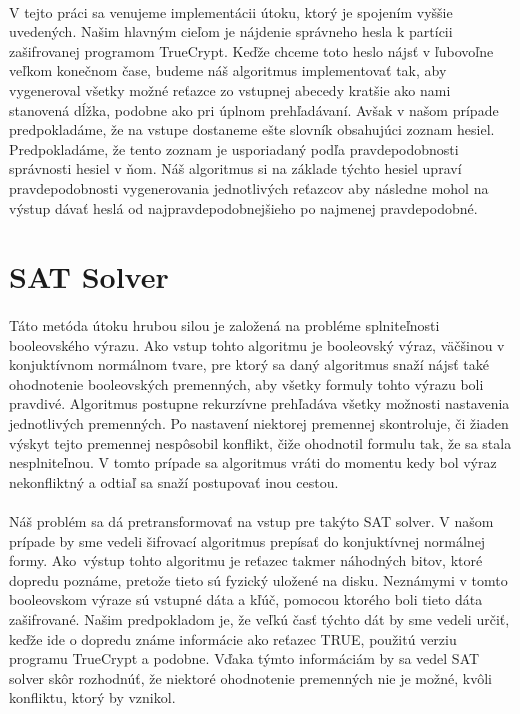 \paragraph{}
V tejto práci sa venujeme implementácii útoku, ktorý je spojením vyššie uvedených. Našim hlavným cieľom je nájdenie správneho hesla k partícii zašifrovanej programom TrueCrypt. Keďže chceme toto heslo nájsť v ľubovoľne veľkom konečnom čase, budeme náš algoritmus implementovať tak, aby vygeneroval všetky možné reťazce zo vstupnej abecedy kratšie ako nami stanovená dĺžka, podobne ako pri úplnom prehľadávaní. Avšak v našom prípade predpokladáme, že na vstupe dostaneme ešte slovník obsahujúci zoznam hesiel. Predpokladáme, že tento zoznam je usporiadaný podľa pravdepodobnosti správnosti hesiel v ňom. Náš algoritmus si na základe týchto hesiel upraví pravdepodobnosti vygenerovania jednotlivých reťazcov aby následne mohol na výstup dávať heslá od najpravdepodobnejšieho po najmenej pravdepodobné. 

\section{SAT Solver}
\paragraph{}
Táto metóda útoku hrubou silou je založená na probléme splniteľnosti booleovského výrazu. Ako vstup tohto algoritmu je booleovský výraz, väčšinou v konjuktívnom normálnom tvare, pre ktorý sa daný algoritmus snaží nájsť také ohodnotenie booleovských premenných, aby všetky formuly tohto výrazu boli pravdivé. Algoritmus postupne rekurzívne prehľadáva všetky možnosti nastavenia jednotlivých premenných. Po nastavení niektorej premennej skontroluje, či žiaden výskyt tejto premennej nespôsobil konflikt, čiže ohodnotil formulu tak, že sa stala nesplniteľnou. V tomto prípade sa algoritmus vráti do momentu kedy bol výraz nekonfliktný a odtiaľ sa snaží postupovať inou cestou.

\paragraph{}
Náš problém sa dá pretransformovať na vstup pre takýto SAT solver. V našom prípade by sme vedeli šifrovací algoritmus prepísať do konjuktívnej normálnej formy. Ako~výstup tohto algoritmu je reťazec takmer náhodných bitov, ktoré dopredu poznáme, pretože tieto sú fyzický uložené na disku. Neznámymi v tomto booleovskom výraze sú vstupné dáta a kľúč, pomocou ktorého boli tieto dáta zašifrované. Našim predpokladom je, že veľkú časť týchto dát by sme vedeli určiť, keďže ide o dopredu známe informácie ako reťazec TRUE, použitú verziu programu TrueCrypt a podobne. Vďaka týmto informáciám by sa vedel SAT solver skôr rozhodnúť, že niektoré ohodnotenie premenných nie je možné, kvôli konfliktu, ktorý by vznikol.

